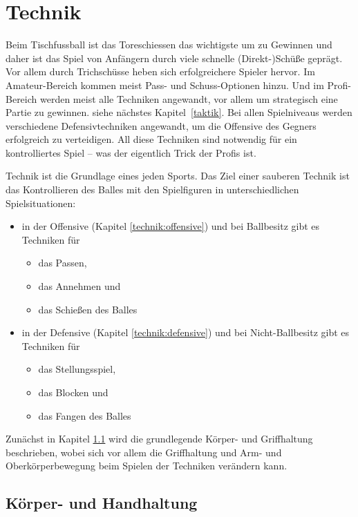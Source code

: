 \chapter{Technik}
\label{technik}

Beim Tischfussball ist das Toreschiessen das wichtigste um zu Gewinnen und daher ist das Spiel von Anfängern durch viele schnelle (Direkt-)Schüße geprägt.
Vor allem durch Trichschüsse heben sich erfolgreichere Spieler hervor.
Im Amateur-Bereich kommen meist Pass- und Schuss-Optionen hinzu.
Und im Profi-Bereich werden meist alle Techniken angewandt, vor allem um strategisch eine Partie zu gewinnen. siehe nächstes Kapitel~\ref{taktik}. 
Bei allen Spielniveaus werden verschiedene Defensivtechniken angewandt, um die Offensive des Gegners erfolgreich zu verteidigen.
All diese Techniken sind notwendig für ein kontrolliertes Spiel -- was der eigentlich Trick der Profis ist.

Technik ist die Grundlage eines jeden Sports. 
Das Ziel einer sauberen Technik ist das Kontrollieren des Balles mit den Spielfiguren in unterschiedlichen Spielsituationen:
\begin{itemize}
    \item in der Offensive (Kapitel \ref{technik:offensive}) und bei Ballbesitz gibt es Techniken für 
        \begin{itemize}
            \item das Passen, 
            \item das Annehmen und 
            \item das Schießen des Balles
        \end{itemize}
    \item in der Defensive (Kapitel \ref{technik:defensive}) und bei Nicht-Ballbesitz gibt es Techniken für 
        \begin{itemize}
            \item das Stellungsspiel, 
            \item das Blocken und 
            \item das Fangen des Balles  
        \end{itemize}
\end{itemize}
Zunächst in Kapitel \ref{technik:haltung} wird die grundlegende Körper- und Griffhaltung beschrieben, wobei sich vor allem die Griffhaltung und Arm- und Oberkörperbewegung beim Spielen der Techniken verändern kann. 


\section{Körper- und Handhaltung}
\label{technik:haltung}


